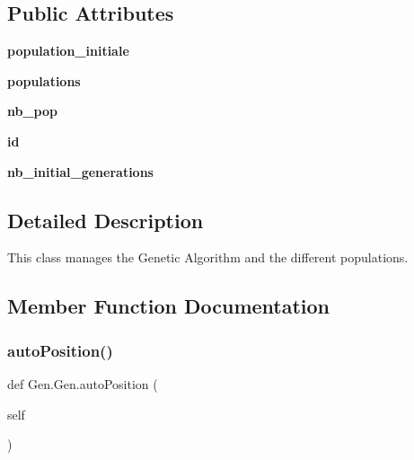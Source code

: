 \subsection*{Public Attributes}
\begin{DoxyCompactItemize}
\item 
\mbox{\label{classGen_1_1Gen_a8c0bf8caa42513ebedd81324c39fdd4a}} 
{\bfseries population\+\_\+initiale}
\item 
\mbox{\label{classGen_1_1Gen_a2f6b2b61feeb2330482972b065fcb6f6}} 
{\bfseries populations}
\item 
\mbox{\label{classGen_1_1Gen_a456a577f2e3b3f520b42c5edcf4c7226}} 
{\bfseries nb\+\_\+pop}
\item 
\mbox{\label{classGen_1_1Gen_ac0bc08a1afe0c8428b7b347832008168}} 
{\bfseries id}
\item 
\mbox{\label{classGen_1_1Gen_a8086ec60df1305c4bd523b1951544c29}} 
{\bfseries nb\+\_\+initial\+\_\+generations}
\end{DoxyCompactItemize}


\subsection{Detailed Description}
This class manages the Genetic Algorithm and the different populations. 



\subsection{Member Function Documentation}
\mbox{\label{classGen_1_1Gen_ae1833b442b21f180fdc7987536a101d9}} 
\subsubsection{\texorpdfstring{autoPosition()}{autoPosition()}}
{\footnotesize\ttfamily def Gen.\+Gen.\+auto\+Position (\begin{DoxyParamCaption}\item[{}]{self }\end{DoxyParamCaption})}



